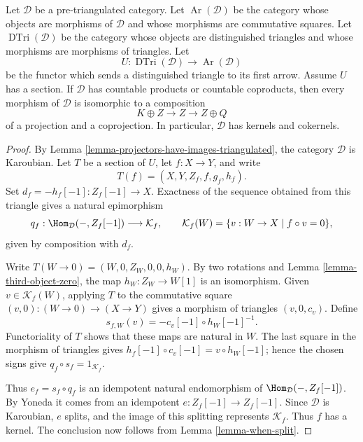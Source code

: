 \begin{lemma}
\label{lemma-functorial-triangles-decomposable}
Let $\mathcal{D}$ be a pre-triangulated category. Let
$\operatorname{Ar}(\mathcal{D})$ be the category whose objects are morphisms
of $\mathcal{D}$ and whose morphisms are commutative squares. Let
$\operatorname{DTri}(\mathcal{D})$ be the category whose objects are
distinguished triangles and whose morphisms are morphisms of triangles. Let
$$
U : \operatorname{DTri}(\mathcal{D}) \longrightarrow
\operatorname{Ar}(\mathcal{D})
$$
be the functor which sends a distinguished triangle to its first arrow.
Assume $U$ has a section. If $\mathcal{D}$ has countable products or countable
coproducts, then every morphism of $\mathcal{D}$ is isomorphic to a composition
$$
K \oplus Z \longrightarrow Z \longrightarrow Z \oplus Q
$$
of a projection and a coprojection. In particular, $\mathcal{D}$ has kernels
and cokernels.
\end{lemma}

\begin{proof}
By Lemma \ref{lemma-projectors-have-images-triangulated}, the category
$\mathcal{D}$ is Karoubian. Let $T$ be a section of $U$, let $f : X \to Y$,
and write
$$
T(f) = (X, Y, Z_f, f, g_f, h_f).
$$
Set $d_f = -h_f[-1] : Z_f[-1] \to X$. Exactness of the sequence obtained from
this triangle gives a natural epimorphism
$$
q_f : \Hom_\mathcal{D}(-, Z_f[-1]) \longrightarrow \mathcal{K}_f,
\qquad
\mathcal{K}_f(W) = \{v : W \to X \mid f \circ v = 0\},
$$
given by composition with $d_f$.

Write $T(W \to 0) = (W, 0, Z_W, 0, 0, h_W)$. By two rotations and
Lemma \ref{lemma-third-object-zero}, the map $h_W : Z_W \to W[1]$ is an
isomorphism. Given $v \in \mathcal{K}_f(W)$, applying $T$ to the commutative
square $(v, 0) : (W \to 0) \to (X \to Y)$ gives a morphism of triangles
$(v, 0, c_v)$. Define
$$
s_{f,W}(v) = -c_v[-1] \circ h_W[-1]^{-1}.
$$
Functoriality of $T$ shows that these maps are natural in $W$. The last square
in the morphism of triangles gives
$h_f[-1] \circ c_v[-1] = v \circ h_W[-1]$; hence the chosen signs give
$q_f \circ s_f = 1_{\mathcal{K}_f}$.

Thus $e_f = s_f \circ q_f$ is an idempotent natural endomorphism of
$\Hom_\mathcal{D}(-, Z_f[-1])$. By Yoneda it comes from an idempotent
$e : Z_f[-1] \to Z_f[-1]$. Since $\mathcal{D}$ is Karoubian, $e$ splits, and
the image of this splitting represents $\mathcal{K}_f$. Thus $f$ has a kernel.
The conclusion now follows from Lemma \ref{lemma-when-split}.
\end{proof}

